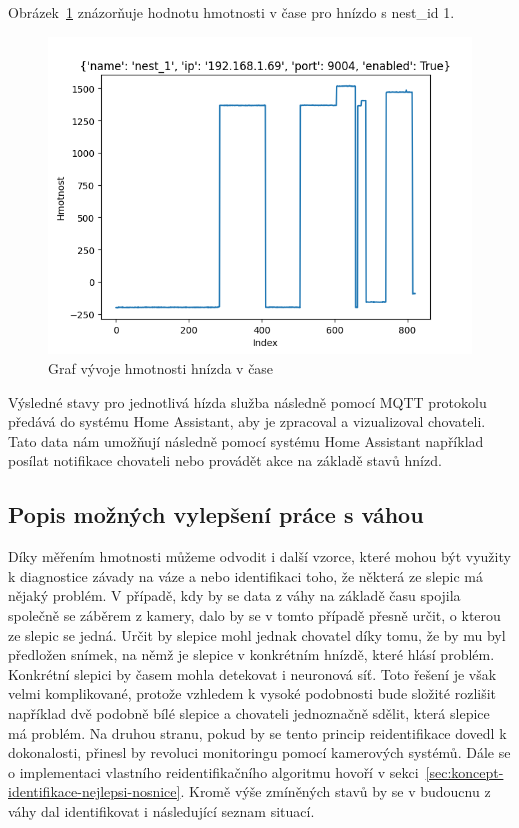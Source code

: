 Obrázek~\ref{fig:weight_egg_chart_timeline} znázorňuje hodnotu hmotnosti v čase pro hnízdo s nest\_id 1.

\begin{figure}[h]
    \centering
    \includegraphics[width=\textwidth]{img/weight_egg_chart_timeline}
    \caption{Graf vývoje hmotnosti hnízda v čase}
    \label{fig:weight_egg_chart_timeline}
\end{figure}

Výsledné stavy pro jednotlivá hízda služba následně pomocí MQTT protokolu předává do systému Home Assistant, aby je zpracoval a vizualizoval chovateli.
Tato data nám umožňují následně pomocí systému Home Assistant například posílat notifikace chovateli nebo provádět akce na základě stavů hnízd.
\newline


\subsection*{Popis možných vylepšení práce s váhou}
Díky měřením hmotnosti můžeme odvodit i další vzorce, které mohou být využity k diagnostice závady na váze a nebo identifikaci toho, že některá ze slepic má nějaký problém.
V případě, kdy by se data z váhy na základě času spojila společně se záběrem z kamery, dalo by se v tomto případě přesně určit, o kterou ze slepic se jedná. \newline
Určit by slepice mohl jednak chovatel díky tomu, že by mu byl předložen snímek, na němž je slepice v konkrétním hnízdě, které hlásí problém.
Konkrétní slepici by časem mohla detekovat i neuronová síť. \newline
Toto řešení je však velmi komplikované, protože vzhledem k vysoké podobnosti bude složité rozlišit například dvě podobně bílé slepice a chovateli jednoznačně sdělit, která slepice má problém.
Na druhou stranu, pokud by se tento princip reidentifikace dovedl k dokonalosti, přinesl by revoluci monitoringu pomocí kamerových systémů.
Dále se o implementaci vlastního reidentifikačního algoritmu hovoří v sekci~\ref{sec:koncept-identifikace-nejlepsi-nosnice}.
\newline
Kromě výše zmíněných stavů by se v budoucnu z váhy dal identifikovat i následující seznam situací.

